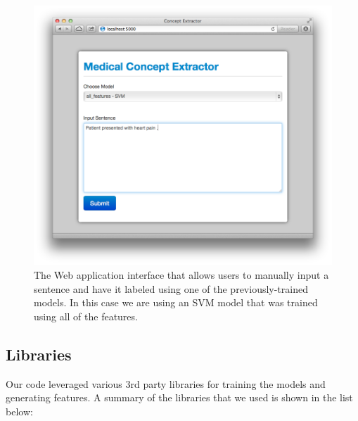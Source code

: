 \documentclass[preprint]{style}
\begin{document}
\begin{figure}
\begin{center}
	\includegraphics[width=1\columnwidth]{figures/web-interface.png}
\end{center}
\caption{The Web application interface that allows users to manually input a sentence and have it labeled using one of the previously-trained models. In this case we are using an SVM model that was trained using all of the features.}
\label{fig:web_interface}
\end{figure}


\subsection{Libraries}

Our code leveraged various 3rd party libraries for training the models and generating features. A summary of the libraries that we used is shown in the list below:
\end{document}
